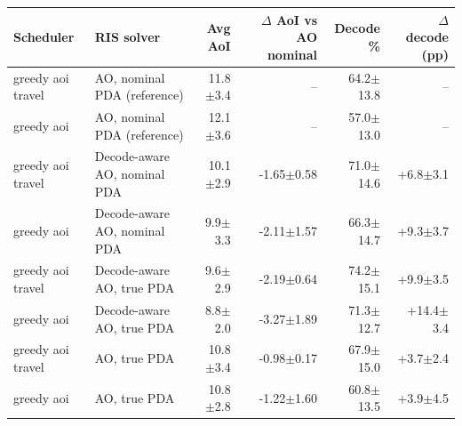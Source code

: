 \begin{tabular}{llrrrr}
\toprule
Scheduler & RIS solver & Avg AoI & $\Delta$ AoI vs AO nominal & Decode \% & $\Delta$ decode (pp) \\
\midrule
greedy aoi travel & AO, nominal PDA (reference) & 11.8$\pm$3.4 & -- & 64.2$\pm$13.8 & -- \\
greedy aoi & AO, nominal PDA (reference) & 12.1$\pm$3.6 & -- & 57.0$\pm$13.0 & -- \\
greedy aoi travel & Decode-aware AO, nominal PDA & 10.1$\pm$2.9 & -1.65$\pm$0.58 & 71.0$\pm$14.6 & +6.8$\pm$3.1 \\
greedy aoi & Decode-aware AO, nominal PDA & 9.9$\pm$3.3 & -2.11$\pm$1.57 & 66.3$\pm$14.7 & +9.3$\pm$3.7 \\
greedy aoi travel & Decode-aware AO, true PDA & 9.6$\pm$2.9 & -2.19$\pm$0.64 & 74.2$\pm$15.1 & +9.9$\pm$3.5 \\
greedy aoi & Decode-aware AO, true PDA & 8.8$\pm$2.0 & -3.27$\pm$1.89 & 71.3$\pm$12.7 & +14.4$\pm$3.4 \\
greedy aoi travel & AO, true PDA & 10.8$\pm$3.4 & -0.98$\pm$0.17 & 67.9$\pm$15.0 & +3.7$\pm$2.4 \\
greedy aoi & AO, true PDA & 10.8$\pm$2.8 & -1.22$\pm$1.60 & 60.8$\pm$13.5 & +3.9$\pm$4.5 \\
\bottomrule
\end{tabular}
